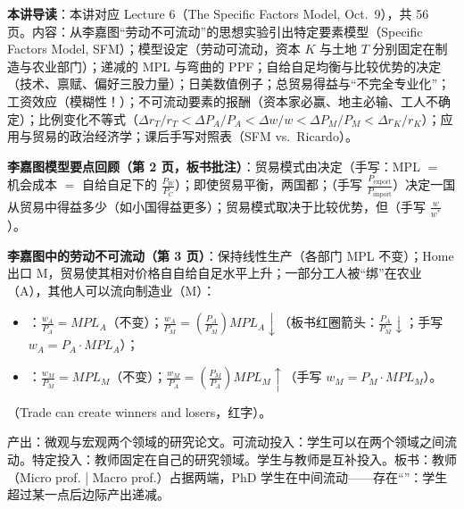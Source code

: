 
\textbf{本讲导读}：本讲对应 Lecture 6（The Specific Factors Model, Oct.\ 9），共 56 页。内容：从李嘉图``劳动不可流动''的思想实验引出特定要素模型（Specific Factors Model, SFM）；模型设定（劳动可流动，资本 $K$ 与土地 $T$ 分别固定在制造与农业部门）；递减的 MPL 与弯曲的 PPF；自给自足均衡与比较优势的决定（技术、禀赋、偏好三股力量）；日美数值例子；总贸易得益与``不完全专业化''；工资效应（模糊性！）；不可流动要素的报酬（资本家必赢、地主必输、工人不确定）；比例变化不等式（$\Delta r_T/r_T < \Delta P_A/P_A < \Delta w/w < \Delta P_M/P_M < \Delta r_K/r_K$）；应用与贸易的政治经济学；课后手写对照表（SFM vs.\ Ricardo）。


\textbf{李嘉图模型要点回顾（第 2 页，板书批注）}：贸易模式由决定（手写：MPL $=$ 机会成本 $=$ 自给自足下的 $\frac{P_W}{P_C}$）；即使贸易平衡，两国都；（手写 $\frac{P_{\text{export}}}{P_{\text{import}}}$）决定一国从贸易中得益多少（如小国得益更多）；贸易模式取决于比较优势，但（手写 $\frac{w}{w^*}$）。

\textbf{李嘉图中的劳动不可流动（第 3 页）}：保持线性生产（各部门 MPL 不变）；Home 出口 M，贸易使其相对价格自自给自足水平上升；一部分工人被``绑''在农业（A），其他人可以流向制造业（M）：
\begin{itemize}
  \item {}：$\frac{w_A}{P_A} = MPL_A$（不变）；$\frac{w_A}{P_M} = (\frac{P_A}{P_M}) MPL_A \downarrow$（板书红圈箭头：$\frac{P_A}{P_M} \downarrow$；手写 $w_A = P_A \cdot MPL_A$）；
  \item {}：$\frac{w_M}{P_M} = MPL_M$（不变）；$\frac{w_M}{P_A} = (\frac{P_M}{P_A}) MPL_M \uparrow$（手写 $w_M = P_M \cdot MPL_M$）。
\end{itemize}
（Trade can create winners and losers，红字）。

\begin{intubox}
产出：微观与宏观两个领域的研究论文。可流动投入：学生可以在两个领域之间流动。特定投入：教师固定在自己的研究领域。学生与教师是互补投入。板书：教师（Micro prof. | Macro prof.）占据两端，PhD 学生在中间流动——存在``''：学生超过某一点后边际产出递减。
\end{intubox}


